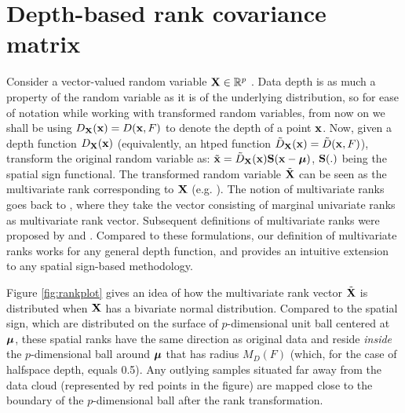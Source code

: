 \documentclass[fleqn,11pt]{article}
\begin{document}
\section{Depth-based rank covariance matrix} \label{section:dcmSection}

Consider a vector-valued random variable ${\mathbf{X}} \in \mathbb{R}^p$ . Data depth is as much a property of the random variable as it is of the underlying distribution, so for ease of notation while working with transformed random variables, from now on we shall be using $D_{\mathbf{X}}({\bf{x}}) = D({\bf{x}}, F)$ to denote the depth of a point ${\bf{x}}$. Now, given a depth function $D_{{\mathbf{X}}}({\bf{x}})$ (equivalently, an htped function $\tilde D_{\mathbf{X}}({\bf{x}}) = \tilde D({\bf{x}}, F)$), transform the original random variable as: $\tilde {{\bf{x}}} = \tilde D_{\mathbf{X}}({\bf{x}}) {\mathbf{S}}({\bf{x}} - {\boldsymbol{\mu}})$, ${\mathbf{S}}(.)$ being the spatial sign functional. The transformed random variable $\tilde {{\mathbf{X}}}$ can be seen as the multivariate rank corresponding to ${\mathbf{X}}$ (e.g. \cite{serfling2006}). The notion of multivariate ranks goes back to \cite{PuriSenBook}, where they take the vector consisting of marginal univariate ranks as multivariate rank vector. Subsequent definitions of multivariate ranks were proposed by \cite{MottonenOja95,HallinPaindaveine02} and \cite{Chernozhukov14}. Compared to these formulations, our definition of multivariate ranks works for any general depth function, and provides an intuitive extension to any spatial sign-based methodology.

Figure \ref{fig:rankplot} gives an idea of how the multivariate rank vector $\tilde {{\mathbf{X}}}$ is distributed when ${\mathbf{X}}$ has a bivariate normal distribution. Compared to the spatial sign, which are distributed on the surface of $p$-dimensional unit ball centered at ${\boldsymbol{\mu}}$, these spatial ranks have the same direction as original data and reside \textit{inside} the $p$-dimensional ball around ${\boldsymbol{\mu}}$ that has radius $M_D(F)$ (which, for the case of halfspace depth, equals 0.5). Any outlying samples situated far away from the data cloud (represented by red points in the figure) are mapped close to the boundary of the $p$-dimensional ball after the rank transformation.
\end{document}

